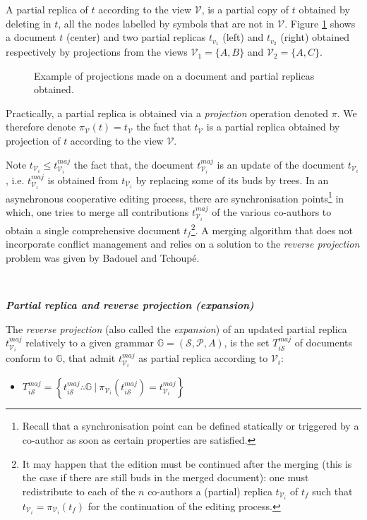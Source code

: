  
A partial replica of $t$ according to the view $\mathcal{V}$, is a partial copy of $t$ obtained by deleting in $t$, all the nodes labelled by symbols that are not in $\mathcal{V}$. 
Figure \ref{chap2:fig:partial-view} shows a document $t$ (center) and two partial replicas $t_{v_1}$ (left) and $t_{v_2}$ (right) obtained respectively by projections from the views $\mathcal{V}_1 = \{A,B\}$ and $\mathcal{V}_2 = \{A,C\}$. 
\begin{figure}[ht!]
	\noindent
	\caption{Example of projections made on a document and partial replicas obtained.}
	\label{chap2:fig:partial-view}
\end{figure}


Practically, a partial replica is obtained via a \textit{projection} operation denoted $\pi$. We therefore denote $\pi_{\mathcal{V}}(t)= t_{\mathcal{V}}$ the fact that $t_{\mathcal{V}}$ is a partial replica obtained by projection of $t$ according to the view $\mathcal{V}$.

Note $t_{\mathcal{V}_i} \leq t_{\mathcal{V}_i}^{maj}$ the fact that, the document $t_{\mathcal{V}_i}^{maj}$ is an update of the document $t_{\mathcal{V}_i}$, i.e. $t_{\mathcal{V}_i}^{maj}$ is obtained from $t_{\mathcal{V}_i}$ by replacing some of its buds by trees.
In an asynchronous cooperative editing process, there are synchronisation points\footnote{Recall that a synchronisation point can be defined statically or triggered by a co-author as soon as certain properties are satisfied.} in which, one tries to merge all contributions $t_{\mathcal{V}_i}^{maj}$ of the various co-authors to obtain a single comprehensive document $t_f$\footnote{It may happen that the edition must be continued after the merging (this is the case if there are still buds in the merged document): one must redistribute to each of the $n$ co-authors a (partial) replica $t_{\mathcal{V}_i}$ of $t_f$ such that  $t_{\mathcal{V}_i} = \pi_{\mathcal{V}_i}(t_f)$ for the continuation of the editing process.}. A merging algorithm that does not incorporate conflict management and relies on a solution to the \textit{reverse projection} problem was given by Badouel and Tchoup\'e.

~

\noindent\textbf{\textit{Partial replica and reverse projection (expansion)}}

The \textit{reverse projection} (also called the \textit{expansion}) of an updated partial replica $t_{\mathcal{V}_i}^{maj}$ relatively to a given grammar $\mathbb{G}=\left(\mathcal{S},\mathcal{P},A\right)$, is the set $T_{i\mathcal{S}}^{maj}$ of documents conform to $\mathbb{G}$, that admit $t_{\mathcal{V}_i}^{maj}$ as partial replica according to ${\mathcal{V}_i}$:
\begin{itemize}
	\item[] $ T_{i\mathcal{S}}^{maj} = \left\{t_{i\mathcal{S}}^{maj} \therefore \mathbb{G}~ | ~ \pi_{\mathcal{V}_i}\left(t_{i\mathcal{S}}^{maj}\right) = t_{\mathcal{V}_i}^{maj} \right\}
	$
\end{itemize} 

